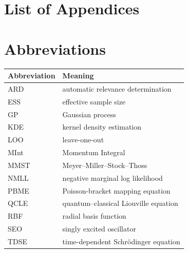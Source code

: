 \documentclass[
  11pt,
  letterpaper,
  onehalfspacing,
  normalmargins,
  equalmargins,
  oneside
]{ut-thesis}
\makeatletter
\newcommand{\listappendixname}{List of Appendices}
\newcommand{\listofappendices}{%
  \chapter*{\listappendixname}%
  \@starttoc{loa}%
}
\makeatother
\begin{document}

\tableofcontents
\listoftables
\listofappendices

\chapter*{Abbreviations}
{}

\begin{tabularx}{\textwidth}{@{}L{0.18\textwidth}Y@{}}
\toprule
\textbf{Abbreviation} & \textbf{Meaning} \\
\midrule
ARD & automatic relevance determination \\
ESS & effective sample size \\
GP & Gaussian process \\
KDE & kernel density estimation \\
LOO & leave-one-out \\
MInt & Momentum Integral \\
MMST & Meyer--Miller--Stock--Thoss \\
NMLL & negative marginal log likelihood \\
PBME & Poisson-bracket mapping equation \\
QCLE & quantum--classical Liouville equation \\
RBF & radial basis function \\
SEO & singly excited oscillator \\
TDSE & time-dependent Schr\"odinger equation \\
\bottomrule
\end{tabularx}
\end{document}
